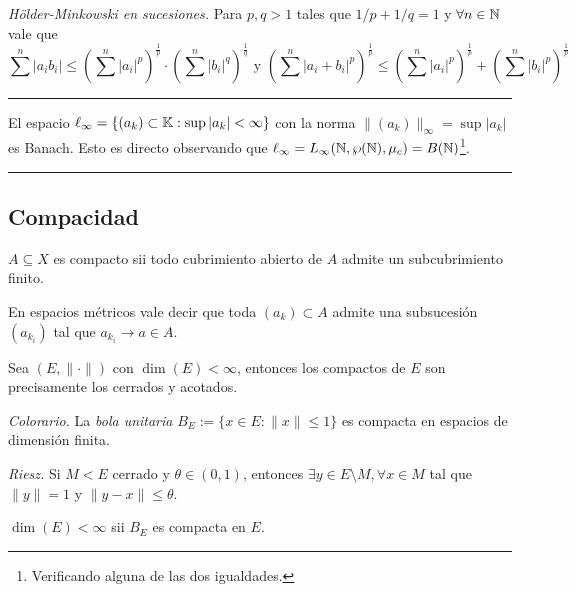 \E

\begin{proposition}
   \emph{Hölder-Minkowski en sucesiones.} Para \(p,q>1\) tales que \(1/p+1/q = 1\) y \(\forall n\in \mathbb{N}\) vale que 
   \[\sum^n |a_ib_i|\leq \left(\sum^{n}|a_i|^p\right)^{\frac{1}{p}} \cdot \left(\sum^{n}|b_i|^q\right)^{\frac{1}{q}}\text{\ \ y \ \ } \left(\sum^{n}|a_i + b_i|^p\right)^{\frac{1}{p}}\leq \left(\sum^{n}|a_i|^{p}\right)^{\frac{1}{p}} + \left(\sum^{n}|b_i|^{p}\right)^{\frac{1}{p}}\]
\end{proposition}

\E

\hrule
\begin{example}
    El espacio \(\ell_\infty = \{(a_k)\subset \mathbb{K}: \sup |a_k| <\infty\} \) con la norma \(\|(a_k)\|_\infty = \sup |a_k|\) es Banach. Esto es directo observando que \(\ell_\infty = L_\infty(\mathbb{N},\wp(\mathbb{N}),\mu_c) = B(\mathbb{N})\)\footnote{Verificando alguna de las dos igualdades.}.  
\end{example}
\hrule 

\subsection*{Compacidad}

\begin{definition}
    \(A\subseteq X\) es compacto sii todo cubrimiento abierto de \(A\) admite un subcubrimiento finito. 
\end{definition}
\begin{note}
    En espacios métricos vale decir que toda \((a_k)\subset A\) admite una subsucesión \((a_{k_i})\) tal que \(a_{k_i} \rightarrow a \in A\). 
\end{note}
\begin{proposition}
    Sea \((E,\|\cdot\|)\) con \(\dim(E)<\infty\), entonces los compactos de \(E\) son precisamente los cerrados y acotados. 
\end{proposition}
\begin{note}
    \emph{Colorario.} La \emph{bola unitaria} \(B_E := \{x\in E : \|x\|\leq 1 \}\) es compacta en espacios de dimensión finita. 
\end{note}
\begin{proposition}
    \emph{Riesz.} Si \(M<E\) cerrado y \(\theta \in (0,1)\), entonces \(\exists y\in E\setminus M,\forall x\in M\) tal que \(\|y\|=1\) y \(\|y-x\|\leq \theta \). 
\end{proposition}
\begin{theorem}
    \(\dim(E)<\infty\) sii \(B_E\) es compacta en \(E\). 
\end{theorem}


